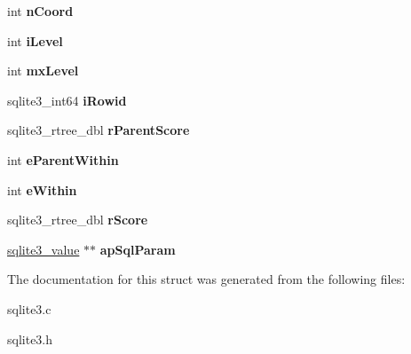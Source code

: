 \begin{DoxyCompactItemize}
\item 
int {\bfseries n\+Coord}\hypertarget{structsqlite3__rtree__query__info_aa4b95a36fe7306e17e8cf9329fcb0964}{}\label{structsqlite3__rtree__query__info_aa4b95a36fe7306e17e8cf9329fcb0964}

\item 
int {\bfseries i\+Level}\hypertarget{structsqlite3__rtree__query__info_af91ca2d5f867b3b0aa9c91920a3b5b45}{}\label{structsqlite3__rtree__query__info_af91ca2d5f867b3b0aa9c91920a3b5b45}

\item 
int {\bfseries mx\+Level}\hypertarget{structsqlite3__rtree__query__info_ac84533734fb4c86c3f2deba904118785}{}\label{structsqlite3__rtree__query__info_ac84533734fb4c86c3f2deba904118785}

\item 
sqlite3\+\_\+int64 {\bfseries i\+Rowid}\hypertarget{structsqlite3__rtree__query__info_a9e43489993c8aeace851f86eaa00ec26}{}\label{structsqlite3__rtree__query__info_a9e43489993c8aeace851f86eaa00ec26}

\item 
sqlite3\+\_\+rtree\+\_\+dbl {\bfseries r\+Parent\+Score}\hypertarget{structsqlite3__rtree__query__info_af7da93e7fc405eec7e7ec90ab237eab2}{}\label{structsqlite3__rtree__query__info_af7da93e7fc405eec7e7ec90ab237eab2}

\item 
int {\bfseries e\+Parent\+Within}\hypertarget{structsqlite3__rtree__query__info_a8bd37c6af5427c35830f674a4db682c3}{}\label{structsqlite3__rtree__query__info_a8bd37c6af5427c35830f674a4db682c3}

\item 
int {\bfseries e\+Within}\hypertarget{structsqlite3__rtree__query__info_ad1038309f7ea55472a7ff99bf4f9d514}{}\label{structsqlite3__rtree__query__info_ad1038309f7ea55472a7ff99bf4f9d514}

\item 
sqlite3\+\_\+rtree\+\_\+dbl {\bfseries r\+Score}\hypertarget{structsqlite3__rtree__query__info_af449e4a3607573d17b3d31c67b6e1584}{}\label{structsqlite3__rtree__query__info_af449e4a3607573d17b3d31c67b6e1584}

\item 
\hyperlink{structMem}{sqlite3\+\_\+value} $\ast$$\ast$ {\bfseries ap\+Sql\+Param}\hypertarget{structsqlite3__rtree__query__info_a91c604c985d05e67f08b7370d7bf92aa}{}\label{structsqlite3__rtree__query__info_a91c604c985d05e67f08b7370d7bf92aa}

\end{DoxyCompactItemize}


The documentation for this struct was generated from the following files\+:\begin{DoxyCompactItemize}
\item 
sqlite3.\+c\item 
sqlite3.\+h\end{DoxyCompactItemize}

